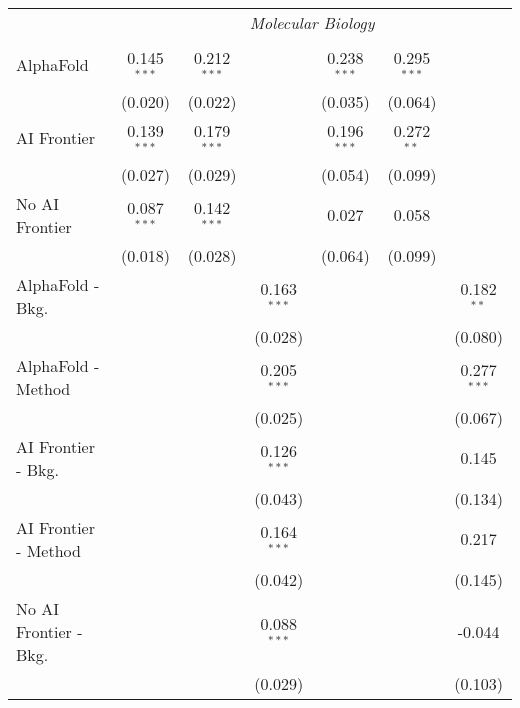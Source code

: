 \begin{tabular}{lcccccc}
 & \multicolumn{6}{c}{\textit{Molecular Biology}} \\ \\
   AlphaFold               & 0.145$^{***}$ & 0.212$^{***}$ &               & 0.238$^{***}$ & 0.295$^{***}$ &   \\   
                           & (0.020)       & (0.022)       &               & (0.035)       & (0.064)       &   \\   
   AI Frontier             & 0.139$^{***}$ & 0.179$^{***}$ &               & 0.196$^{***}$ & 0.272$^{**}$  &   \\   
                           & (0.027)       & (0.029)       &               & (0.054)       & (0.099)       &   \\   
   No AI Frontier          & 0.087$^{***}$ & 0.142$^{***}$ &               & 0.027         & 0.058         &   \\   
                           & (0.018)       & (0.028)       &               & (0.064)       & (0.099)       &   \\   
   AlphaFold - Bkg.        &               &               & 0.163$^{***}$ &               &               & 0.182$^{**}$\\   
                           &               &               & (0.028)       &               &               & (0.080)\\   
   AlphaFold - Method      &               &               & 0.205$^{***}$ &               &               & 0.277$^{***}$\\   
                           &               &               & (0.025)       &               &               & (0.067)\\   
   AI Frontier - Bkg.      &               &               & 0.126$^{***}$ &               &               & 0.145\\   
                           &               &               & (0.043)       &               &               & (0.134)\\   
   AI Frontier - Method    &               &               & 0.164$^{***}$ &               &               & 0.217\\   
                           &               &               & (0.042)       &               &               & (0.145)\\   
   No AI Frontier - Bkg.   &               &               & 0.088$^{***}$ &               &               & -0.044\\   
                           &               &               & (0.029)       &               &               & (0.103)\\   

\end{tabular}
